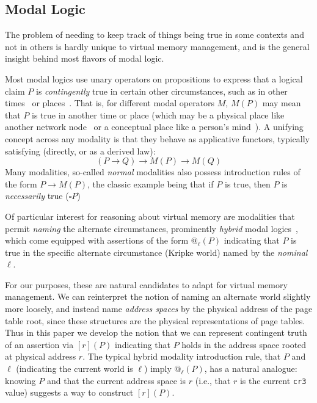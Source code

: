 \subsection{Modal Logic}
\label{sec:backgroundonmodallogic}
The problem of needing to keep track of things being true in some contexts and not in others is hardly unique to virtual memory management, and is the general insight behind most flavors of modal logic.

Most modal logics use unary operators on propositions to express that a logical claim $P$ is \emph{contingently} true in certain other circumstances, such as in other times~\cite{pnueli1977} or places~\cite{gordon2019modal}. That is, for different modal operators $M$, $M(P)$ may mean that $P$ is true in another time or place (which may be a physical place like another network node~\cite{murphy,gordon2019modal} or a conceptual place like a person's mind~\cite{hintikka1962knowledge}). A unifying concept across any modality is that they behave as applicative functors, typically satisfying (directly, or as a derived law):
\[ (P\rightarrow Q) \rightarrow M(P) \rightarrow M(Q)\]
Many modalities, so-called \emph{normal} modalities also possess introduction rules of the form $P\rightarrow M(P)$, the classic example being that if $P$ is true, then $P$ is \emph{necessarily} true ($\square P$)

Of particular interest for reasoning about virtual memory are modalities that permit \emph{naming} the alternate circumstances, prominently \emph{hybrid} modal logics~\cite{blackburn1995hybrid,areces2001hybrid}, which come equipped with assertions of the form $@_\ell(P)$ indicating that $P$ is true in the specific alternate circumstance (Kripke world) named by the \emph{nominal} $\ell$.

For our purposes, these are natural candidates to adapt for virtual memory management. We can reinterpret the notion of naming an alternate world slightly more loosely, and instead name \emph{address spaces} by the physical address of the page table root, since these structures are the physical representations of page tables. Thus in this paper we develop the notion that we can represent contingent truth of an assertion via $[r](P)$ indicating that $P$ holds in the address space rooted at physical address $r$.
The typical hybrid modality introduction rule, that $P$ and $\ell$ (indicating the current world is $\ell$) imply $@_\ell(P)$, has a natural analogue: knowing $P$ and that the current address space is $r$ (i.e., that $r$ is the current \texttt{cr3} value) suggests a way to construct $[r](P)$.

